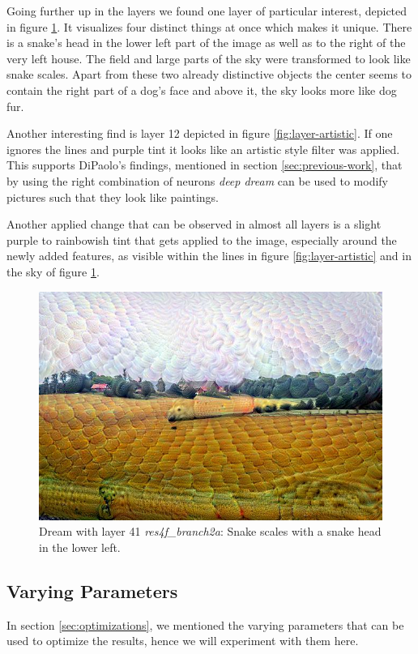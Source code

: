 Going further up in the layers we found one layer of particular interest, depicted in figure \ref{fig:layer-snake}.
It visualizes four distinct things at once which makes it unique.
There is a snake's head in the lower left part of the image as well as to the right of the very left house.
The field and large parts of the sky were transformed to look like snake scales.
Apart from these two already distinctive objects the center seems to contain the right part of a dog's face and above it, the sky looks more like dog fur.

Another interesting find is layer 12 depicted in figure \ref{fig:layer-artistic}.
If one ignores the lines and purple tint it looks like an artistic style filter was applied.
This supports DiPaolo's findings, mentioned in section \ref{sec:previous-work}, that by using the right combination of neurons \textit{deep dream} can be used to modify pictures such that they look like paintings.

Another applied change that can be observed in almost all layers is a slight purple to rainbowish tint that gets applied to the image, especially around the newly added features, as visible within the lines in figure \ref{fig:layer-artistic} and in the sky of figure \ref{fig:layer-snake}.

\begin{figure}[H]
	\centering
	\includegraphics[width=0.7\linewidth]{img/alpsted-landscape_res4f_branch2a.jpg}
	\caption{Dream with layer 41 \emph{res4f\_branch2a}: Snake scales with a snake head in the lower left.}
	\label{fig:layer-snake}
\end{figure}


\subsection{Varying Parameters}
\label{sec:varying-parameters}
In section \ref{sec:optimizations}, we mentioned the varying parameters that can be used to optimize the results, hence we will experiment with them here.


